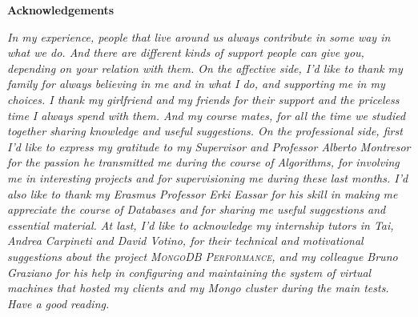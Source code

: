 \thispagestyle{empty}

\begin{center}
  {\bf \Huge Acknowledgements}
\end{center}

\vspace{4cm}


\emph{
 In my experience, people that live around us always contribute in some way in what we do. %
And there are different kinds of support people can give you, depending on your relation with them. 
On the affective side, I’d like to thank my family for always believing in me and in what I do, and supporting me in my choices.
I thank my girlfriend and my friends for their support and the priceless time I always spend with them. And my course mates, for all the time we studied together sharing knowledge and useful suggestions.
On the professional side, first I’d like to express my gratitude to my Supervisor and Professor Alberto Montresor for the passion he transmitted me during the course of Algorithms, for involving me in interesting projects and for supervisioning me during these last months.
I’d also like to thank my Erasmus Professor Erki Eassar for his skill in making me appreciate the course of Databases and for sharing me useful suggestions and essential material.
At last, I’d like to acknowledge my internship tutors in Tai, Andrea Carpineti and David Votino, for their technical and motivational suggestions about the project \textsc{MongoDB Performance}, and my colleague Bruno Graziano for his help in configuring and maintaining the system of virtual machines that hosted my clients and my Mongo cluster during the main tests. 
Have a good reading.
}

